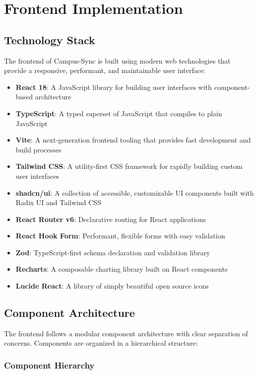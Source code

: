 \chapter{Frontend Implementation}

\section{Technology Stack}

The frontend of Campus-Sync is built using modern web technologies that provide a responsive, performant, and maintainable user interface:

\begin{itemize}
    \item \textbf{React 18}: A JavaScript library for building user interfaces with component-based architecture
    \item \textbf{TypeScript}: A typed superset of JavaScript that compiles to plain JavaScript
    \item \textbf{Vite}: A next-generation frontend tooling that provides fast development and build processes
    \item \textbf{Tailwind CSS}: A utility-first CSS framework for rapidly building custom user interfaces
    \item \textbf{shadcn/ui}: A collection of accessible, customizable UI components built with Radix UI and Tailwind CSS
    \item \textbf{React Router v6}: Declarative routing for React applications
    \item \textbf{React Hook Form}: Performant, flexible forms with easy validation
    \item \textbf{Zod}: TypeScript-first schema declaration and validation library
    \item \textbf{Recharts}: A composable charting library built on React components
    \item \textbf{Lucide React}: A library of simply beautiful open source icons
\end{itemize}

\section{Component Architecture}

The frontend follows a modular component architecture with clear separation of concerns. Components are organized in a hierarchical structure:

\subsection{Component Hierarchy}

